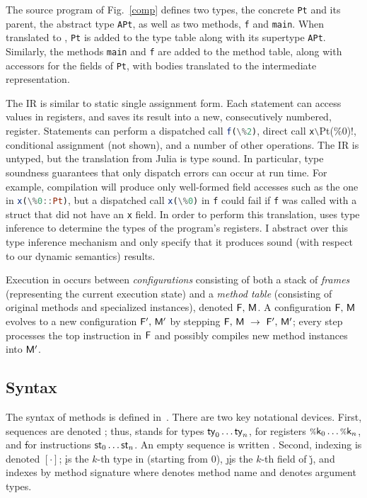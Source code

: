 \documentclass[oneside,openright,titlepage,numbers=noenddot,%
headinclude,footinclude,cleardoublepage=empty,abstract=on,
BCOR=5mm,paper=a4,fontsize=11pt,
dvipsnames
]{scrreprt}
\renewcommand{\c}[1]{\lstinline[language=Julia]!#1!\xspace}
\begin{document}
The source program of Fig.~\ref{comp} defines two types, the concrete \c{Pt} and
its parent, the abstract type \c{APt}, as well as two methods, \c{f} and
\c{main}. When translated to \jules, \c{Pt} is added to the type table along
with its supertype \c{APt}. Similarly, the methods \c{main} and \c{f} are added
to the \jules method table, along with accessors for the fields of \c{Pt}, with
bodies translated to the \jules intermediate representation.

The \jules IR is similar to static single assignment form. Each statement can
access values in registers, and saves its result into a new, consecutively
numbered, register. Statements can perform a dispatched call \c{f(\%2)}, direct
call \c{x\!Pt(\%0)}, conditional assignment (not shown), and a number of other
operations. The IR is untyped, but the translation from Julia is type sound. In
particular, type soundness guarantees that only dispatch errors can occur at run
time. For example, compilation will produce only well-formed field accesses such
as the one in \c{x(\%0::Pt)}, but a dispatched call \c{x(\%0)} in \c{f} could
fail if \c{f} was called with a struct that did not have an \c{x} field. In
order to perform this translation, \jules uses type inference to determine the
types of the program's registers. I abstract over this type inference mechanism
and only specify that it produces sound (with respect to our dynamic semantics)
results. %

Execution in \jules occurs between \emph{configurations} consisting of both
a stack of \emph{frames} \frm (representing the current execution state)
and a \emph{method table} \mtbl (consisting of original methods and specialized
instances), denoted $\mathsf{F},\, \mathsf{M}$. A configuration
$\mathsf{F},\, \mathsf{M}$ evolves to a new configuration
$\mathsf{F}',\, \mathsf{M}'$ by stepping $\mathsf{F},\, \mathsf{M} ~\rightarrow~
\mathsf{F}',\, \mathsf{M}'$; every step processes the top instruction in $\mathsf{F}$
and possibly compiles new method instances into $\mathsf{M}'$.

\subsection{Syntax}

The syntax of \jules methods is defined in~.
There are two key
notational devices. First, sequences are denoted \ol{\,\cdot\,}; thus, \ol\ty
stands for types $\mathsf{ty}_0\dots\mathsf{ty}_n$, \ol{\v\k} for registers $\v\k_0\dots\v\k_n$,
and \ol\st for instructions $\mathsf{st}_0\dots\mathsf{st}_n$. An empty sequence is written
\emp. Second, indexing is denoted $[\cdot]$; \idx{\ol\ty}\k is the $k$-th type
in \ol\ty (starting from 0), \get\j\k is the $k$-th field of \v\j, and
\idx\mtbl{\msig\m{\ol\ty}} indexes \mtbl by method signature where \m denotes
method name and \ol\ty denotes argument types.
\end{document}
